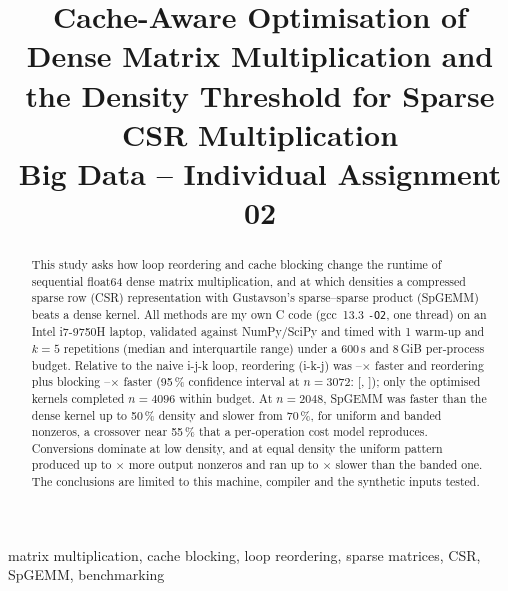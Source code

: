 \documentclass[conference,a4paper]{IEEEtran}
\begin{document}
\title{Cache-Aware Optimisation of Dense Matrix Multiplication and the Density Threshold for Sparse CSR Multiplication\\[0.3em]
\large Big Data -- Individual Assignment 02}

\author{
}

\maketitle

\begin{abstract}
This study asks how loop reordering and cache blocking change the runtime of sequential float64 dense
matrix multiplication, and at which densities a compressed sparse row (CSR) representation with Gustavson's
sparse--sparse product (SpGEMM) beats a dense kernel. All methods are my own C code (gcc~13.3 \texttt{-O2}, one thread) on an
Intel i7-9750H laptop, validated against NumPy/SciPy and timed with 1 warm-up and $k=5$ repetitions (median
and interquartile range) under a 600\,s and 8\,GiB per-process budget. Relative to the naive i-j-k loop,
reordering (i-k-j) was --$\times$ faster and reordering plus blocking
--$\times$ faster (95\,\% confidence interval at $n=3072$: [,
]); only the optimised kernels completed $n=4096$ within budget. At $n=2048$,
SpGEMM was faster than the dense kernel up to 50\,\% density and slower from 70\,\%, for uniform and banded
nonzeros, a crossover near 55\,\% that a per-operation cost model reproduces. Conversions dominate at low
density, and at equal density the uniform pattern produced up to $\times$ more output
nonzeros and ran up to $\times$ slower than the banded one. The conclusions are limited to this
machine, compiler and the synthetic inputs tested.
\end{abstract}

\begin{IEEEkeywords}
matrix multiplication, cache blocking, loop reordering, sparse matrices, CSR, SpGEMM, benchmarking
\end{IEEEkeywords}
\end{document}
